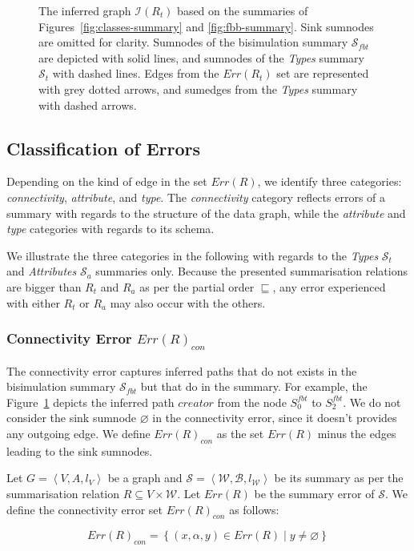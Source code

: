 \begin{figure}
	\centering
	\resizebox{\textwidth}{!}{
		
	}
	\caption{The inferred graph $\mathcal{I}(R_t)$ based on the summaries of Figures~\ref{fig:classes-summary} and \ref{fig:fbb-summary}.
	Sink sumnodes are omitted for clarity. Sumnodes of the bisimulation summary $\mathcal{S}_{fbt}$ are depicted with solid lines, and sumnodes of the \emph{Types} summary $\mathcal{S}_t$ with dashed lines. Edges from the $Err(R_t)$ set are represented with grey dotted arrows, and sumedges from the \emph{Types} summary with dashed arrows.}
	\label{fig:accuracy}
\end{figure}

\subsection{Classification of Errors}
\label{sec:error-classification}

Depending on the kind of edge in the set $Err(R)$, we identify three categories: \emph{connectivity}, \emph{attribute}, and \emph{type}. The \emph{connectivity} category reflects errors of a summary with regards to the structure of the data graph, while the \emph{attribute} and \emph{type} categories with regards to its schema.

We illustrate the three categories in the following with regards to the \emph{Types} $\mathcal{S}_t$ and \emph{Attributes} $\mathcal{S}_a$ summaries only. Because the presented summarisation relations are bigger than $R_t$ and $R_a$ as per the partial order $\sqsubseteq$, any error experienced with either $R_t$ or $R_a$ may also occur with the others.

\subsubsection{Connectivity Error $Err(R)_{con}$}

The connectivity error captures inferred paths that do not exists in the bisimulation summary $\mathcal{S}_{fbt}$ but that do in the summary. For example, the Figure~\ref{fig:accuracy} depicts the inferred path $creator$ from the node $S^{fbt}_0$ to $S^{fbt}_2$.
We do not consider the sink sumnode $\varnothing$ in the connectivity error, since it doesn't provides any outgoing edge. We define $Err(R)_{con}$ as the set $Err(R)$ minus the edges leading to the sink sumnodes.

\begin{definition}
Let $G=\left\langle V, A, l_V \right\rangle$ be a graph and $\mathcal{S} = \left\langle \mathcal{W}, \mathcal{B}, l_{\mathcal{W}} \right\rangle$ be its summary as per the summarisation relation $R \subseteq V \times \mathcal{W}$. Let $Err(R)$ be the summary error of $\mathcal{S}$. We define the connectivity error set $Err(R)_{con}$ as follows:

$$
Err(R)_{con} = \left\lbrace (x, \alpha, y) \in Err(R) \mid y \neq \varnothing \right\rbrace
$$
\end{definition}

